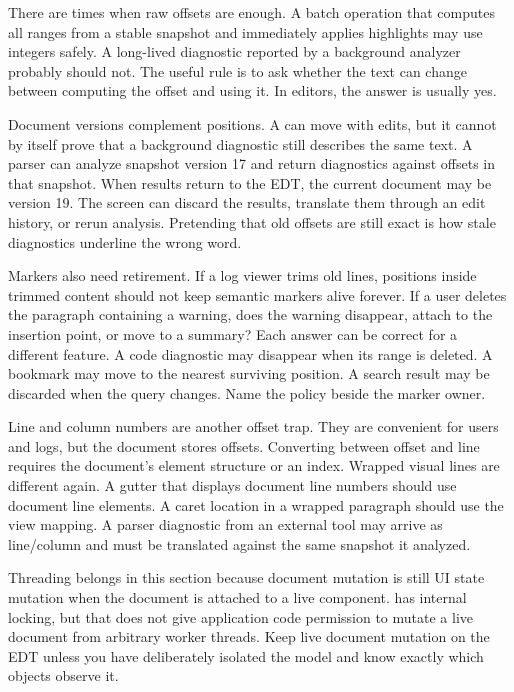 There are times when raw offsets are enough. A batch operation that computes all ranges from a stable snapshot and immediately applies highlights may use integers safely. A long-lived diagnostic reported by a background analyzer probably should not. The useful rule is to ask whether the text can change between computing the offset and using it. In editors, the answer is usually yes.

Document versions complement positions. A  can move with edits,
but it cannot by itself prove that a background diagnostic still describes the
same text. A parser can analyze snapshot version 17 and return diagnostics
against offsets in that snapshot. When results return to the EDT, the current
document may be version 19. The screen can discard the results, translate them
through an edit history, or rerun analysis. Pretending that old offsets are
still exact is how stale diagnostics underline the wrong word.

Markers also need retirement. If a log viewer trims old lines, positions inside
trimmed content should not keep semantic markers alive forever. If a user
deletes the paragraph containing a warning, does the warning disappear, attach
to the insertion point, or move to a summary? Each answer can be correct for a
different feature. A code diagnostic may disappear when its range is deleted.
A bookmark may move to the nearest surviving position. A search result may be
discarded when the query changes. Name the policy beside the marker owner.

Line and column numbers are another offset trap. They are convenient for users
and logs, but the document stores offsets. Converting between offset and line
requires the document's element structure or an index. Wrapped visual lines
are different again. A gutter that displays document line numbers should use
document line elements. A caret location in a wrapped paragraph should use the
view mapping. A parser diagnostic from an external tool may arrive as
line/column and must be translated against the same snapshot it analyzed.

Threading belongs in this section because document mutation is still UI state mutation when the document is attached to a live component.  has internal locking, but that does not give application code permission to mutate a live document from arbitrary worker threads. Keep live document mutation on the EDT unless you have deliberately isolated the model and know exactly which objects observe it.

